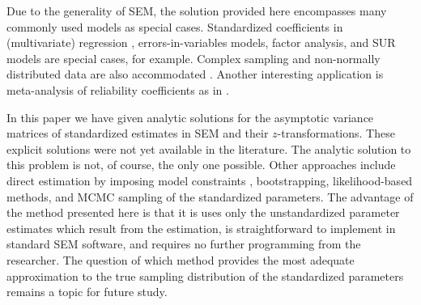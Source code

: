 \documentclass[a4paper, 11pt]{article}
\newcommand{\0}{\boldsymbol{0}}
\begin{document}
\vspace{12pt}
Due to the generality of SEM, the solution provided here encompasses many commonly used models as special cases. Standardized
coefficients in (multivariate) regression \citep[discussed in ][121]{bollen1990direct}, errors-in-variables models, factor analysis, and SUR models are special cases, for example. 
Complex sampling and non-normally distributed data are also accommodated  \citep{muthen1995complex}. Another interesting application
is meta-analysis of reliability coefficients as in \cite{andrews_construct_1984,scherpenzeel_validity_1997,saris_estimation_2007,alwin_margins_2007}.


In this paper we have given analytic solutions for the asymptotic variance matrices of standardized estimates in SEM and their 
$z$-transformations. These explicit solutions were not yet available in the literature. The analytic solution to this problem is not, of course, the only  one possible. Other approaches include
direct estimation by imposing model constraints \citep{chan2009testing}, bootstrapping, likelihood-based methods, and MCMC sampling
of the standardized parameters. The advantage of the method presented here is that it is uses only the unstandardized parameter estimates which result from the estimation, is  straightforward to implement in standard SEM software, and requires no further
programming from the researcher. The question of which 
method provides the most adequate approximation to the true sampling distribution of the standardized parameters  remains
a topic for future study.



\end{document}
